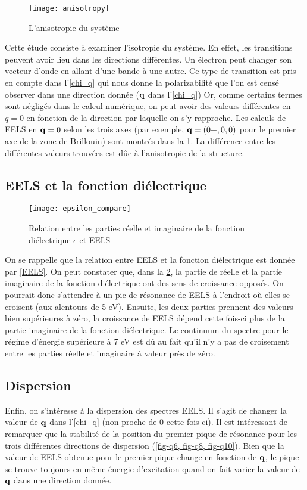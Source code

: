 \begin{figure}[!h]\label{fig-anisotropie}
    \centering
    \texttt{[image: anisotropy]}
    \caption{L'anisotropie du système}
\end{figure}

Cette étude consiste à examiner l'isotropie du système.
En effet, les transitions peuvent avoir lieu dans les directions différentes.
Un électron peut changer son vecteur d'onde en allant d'une bande à une autre.
Ce type de transition est pris en compte dans l'\cref{chi_q} qui nous donne la polarizabilité
que l'on est censé observer dans une direction donnée ($\vb{q}$ dans l'\cref{chi_q})
Or, comme certains termes sont négligés dans le calcul numérique,
on peut avoir des valeurs différentes en $q = 0$ en fonction de la direction par laquelle on s'y rapproche.
Les calculs de EELS en $\vb{q} = 0$ selon les trois axes
(par exemple, $\vb{q}=(0+,0,0)$ pour le premier axe de la zone de Brillouin)
sont montrés dans la \cref{fig-anisotropie}.
La différence entre les différentes valeurs trouvées est dûe à l'anisotropie de la structure.

\subsection{EELS et la fonction diélectrique}

\begin{figure}[!h]\label{fig-epsilon_compare}
    \centering
    \texttt{[image: epsilon\_compare]}
    \caption{Relation entre les parties réelle et imaginaire de la fonction diélectrique $\epsilon$ et EELS}
\end{figure}

On se rappelle que la relation entre EELS et la fonction diélectrique est donnée par \cref{EELS}.
On peut constater que, dans la \cref{fig-epsilon_compare}, la partie de réelle et
la partie imaginaire de la fonction diélectrique ont des sens de croissance opposés.
On pourrait donc s'attendre à un pic de résonance de EELS à l'endroit où elles se croisent
(aux alentours de 5 eV).
Ensuite, les deux parties prennent des valeurs bien supérieures à zéro,
la croissance de EELS dépend cette fois-ci plus de la partie imaginaire de la fonction diélectrique.
Le continuum du spectre pour le régime d'énergie supérieure à 7 eV est dû au fait
qu'il n'y a pas de croisement entre les parties réelle et imaginaire à valeur près de zéro.

\subsection{Dispersion}
Enfin, on s'intéresse à la dispersion des spectres EELS\@.
Il s'agit de changer la valeur de $\vb{q}$ dans l'\cref{chi_q} (non proche de 0 cette fois-ci).
Il est intéressant de remarquer que la stabilité de la position du premier pique de résonance
pour les trois différentes directions de dispersion (\cref{fig-q6, fig-q8, fig-q10}).
Bien que la valeur de EELS obtenue pour le premier pique change en fonction de $\vb{q}$,
le pique se trouve toujours en même énergie d'excitation
quand on fait varier la valeur de $\vb{q}$ dans une direction donnée.

